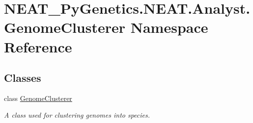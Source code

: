 \hypertarget{namespaceNEAT__PyGenetics_1_1NEAT_1_1Analyst_1_1GenomeClusterer}{}\section{N\+E\+A\+T\+\_\+\+Py\+Genetics.\+N\+E\+A\+T.\+Analyst.\+Genome\+Clusterer Namespace Reference}
\label{namespaceNEAT__PyGenetics_1_1NEAT_1_1Analyst_1_1GenomeClusterer}
\subsection*{Classes}
\begin{DoxyCompactItemize}
\item 
class \hyperlink{classNEAT__PyGenetics_1_1NEAT_1_1Analyst_1_1GenomeClusterer_1_1GenomeClusterer}{Genome\+Clusterer}
\begin{DoxyCompactList}\small\item\em A class used for clustering genomes into species. \end{DoxyCompactList}\end{DoxyCompactItemize}
